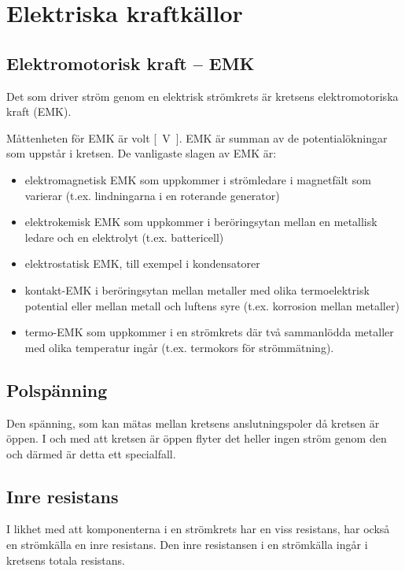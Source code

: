 \section{Elektriska kraftkällor}

\subsection{Elektromotorisk kraft -- EMK}

Det som driver ström genom en elektrisk strömkrets är kretsens elektromotoriska
kraft (EMK).

Måttenheten för EMK är \unit{volt} \unit{[V]}. EMK är summan av de
potentialökningar som uppstår i kretsen. De vanligaste slagen av EMK är:

\begin{itemize}
\item elektromagnetisk EMK som uppkommer i strömledare i magnetfält som
varierar (t.ex. lindningarna i en roterande generator)
\item elektrokemisk EMK som uppkommer i beröringsytan mellan en metallisk
ledare och en elektrolyt (t.ex. battericell)
\item elektrostatisk EMK, till exempel i kondensatorer
\item kontakt-EMK i beröringsytan mellan metaller med olika termoelektrisk
potential eller mellan metall och luftens syre (t.ex. korrosion mellan metaller)
\item termo-EMK som uppkommer i en strömkrets där två sammanlödda metaller med
olika temperatur ingår (t.ex. termokors för strömmätning).
\end{itemize}

\subsection{Polspänning}

Den spänning, som kan mätas mellan kretsens anslutningspoler då kretsen är öppen. 
I och med att kretsen är öppen flyter det heller ingen ström genom den och därmed 
är detta ett specialfall.

\subsection{Inre resistans}
\label{inre_resistans}

I likhet med att komponenterna i en strömkrets har en viss resistans, har också
en strömkälla en inre resistans.
Den inre resistansen i en strömkälla ingår i kretsens totala resistans.

